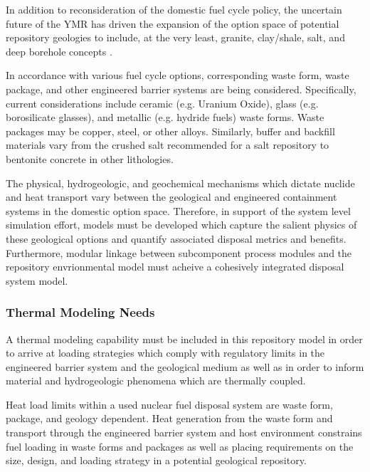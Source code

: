 In addition to reconsideration of the domestic fuel cycle policy, the 
uncertain future of the \gls{YMR} has driven the expansion of the option 
space of potential repository geologies to include, at the very least, 
granite, clay/shale, salt, and deep borehole concepts \cite{nutt_used_2010}. 

In accordance with various fuel cycle options, corresponding waste 
form, waste package, and other engineered barrier systems are being 
considered. Specifically, current considerations include ceramic (e.g.  
Uranium Oxide), glass (e.g.  borosilicate glasses), and metallic (e.g.  
hydride fuels) waste forms. Waste packages may be copper, steel, or 
other alloys. Similarly, buffer and backfill materials vary from the 
crushed salt recommended for a salt repository to bentonite concrete 
in other lithologies. %

The physical, hydrogeologic, and geochemical mechanisms which dictate 
nuclide and heat transport vary between the geological and engineered 
containment systems in the domestic option space.  Therefore, in 
support of the system level simulation effort, models must be 
developed which capture the salient physics of these geological 
options and quantify associated disposal metrics and benefits.  
Furthermore, modular linkage between subcomponent process modules and 
the repository envrionmental model must acheive a cohesively 
integrated disposal system model. 


\subsubsection{Thermal Modeling Needs}
A thermal modeling capability must be included in this repository 
model in order to arrive at loading strategies which comply with 
regulatory limits in the engineered barrier system and the geological 
medium as well as in order to inform material and hydrogeologic 
phenomena which are thermally coupled. 

Heat load limits within a used nuclear fuel disposal system are waste 
form, package, and geology dependent. Heat generation from the waste form 
and transport through the engineered barrier system and host 
environment constrains fuel loading in waste forms and packages as 
well as placing requirements on the size, design, and loading strategy 
in a potential geological repository.

